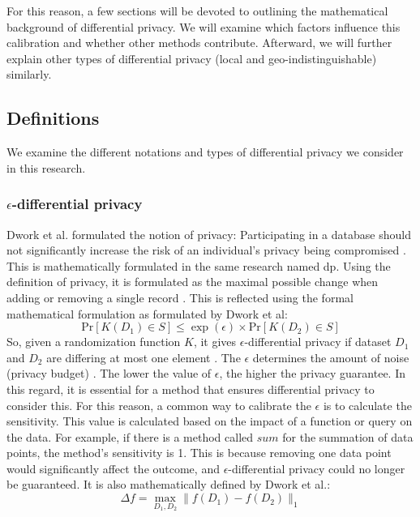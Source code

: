 For this reason, a few sections will be devoted to outlining the mathematical background of differential privacy.
We will examine which factors influence this calibration and whether other methods contribute.
Afterward, we will further explain other types of differential privacy (local and geo-indistinguishable) similarly.


\newpage
\subsection{Definitions}
We examine the different notations and types of differential privacy we consider in this research.

\subsubsection{$\epsilon$-differential privacy}
Dwork et al. formulated the notion of privacy: Participating in a database should not significantly increase the risk of an individual's privacy being compromised \cite{dwork_differential_2006}.
This is mathematically formulated in the same research named \gls{dp}.
Using the definition of privacy, it is formulated as the maximal possible change when adding or removing a single record \citep{dwork_differential_2006, friedman_data_2010}.
This is reflected using the formal mathematical formulation as formulated by Dwork et al:
\begin{equation}
  {\mathrm{Pr}}[K(D_{1})\in S]\leq\exp(\epsilon)\times{\mathrm{Pr}}[K(D_{2})\in S]
  \label{pure-dp}
\end{equation}
So, given a randomization function $K$, it gives $\epsilon$-differential privacy if dataset $D_1$ and $D_2$ are differing at most one element \citep{dwork_differential_2006}.
The $\epsilon$ determines the amount of noise (privacy budget) \citep{friedman_data_2010}.
The lower the value of $\epsilon$, the higher the privacy guarantee.
In this regard, it is essential for a method that ensures differential privacy to consider this.
For this reason, a common way to calibrate the $\epsilon$ is to calculate the sensitivity.
This value is calculated based on the impact of a function or query on the data.
For example, if there is a method called $sum$ for the summation of data points, the method's sensitivity is 1.
This is because removing one data point would significantly affect the outcome, and $\epsilon$-differential privacy could no longer be guaranteed.
It is also mathematically defined by Dwork et al.:
\begin{equation}
  \Delta f=\operatorname*{max}_{D_{1},D_{2}}\|f(D_{1})-f(D_{2})\|_{1}
  \label{sensitivity-dp}
\end{equation}
